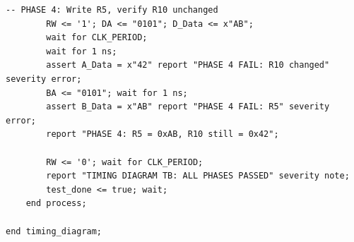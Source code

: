 \documentclass{article}
\begin{document}
\begin{lstlisting}[style=vhdl, caption={RegisterFile\_timing\_tb.vhd}, label={lst:timing-tb}]
        -- PHASE 4: Write R5, verify R10 unchanged
        RW <= '1'; DA <= "0101"; D_Data <= x"AB";
        wait for CLK_PERIOD;
        wait for 1 ns;
        assert A_Data = x"42" report "PHASE 4 FAIL: R10 changed" severity error;
        BA <= "0101"; wait for 1 ns;
        assert B_Data = x"AB" report "PHASE 4 FAIL: R5" severity error;
        report "PHASE 4: R5 = 0xAB, R10 still = 0x42";

        RW <= '0'; wait for CLK_PERIOD;
        report "TIMING DIAGRAM TB: ALL PHASES PASSED" severity note;
        test_done <= true; wait;
    end process;

end timing_diagram;
\end{lstlisting}

\ifdefined\mainfile\else
\end{document}
